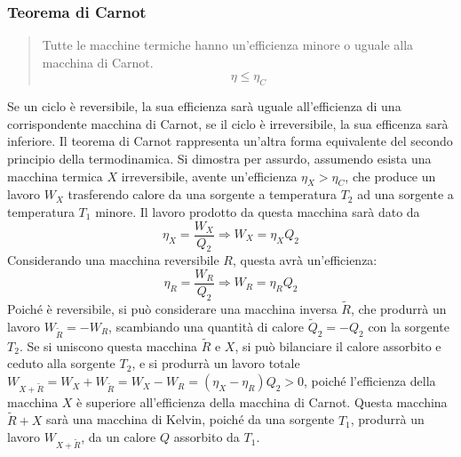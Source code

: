 \documentclass{article}
\numberwithin{equation}{subsection}
\begin{document}
\subsubsection{Teorema di Carnot}
\begin{quotation}
    Tutte le macchine termiche hanno un'efficienza minore o uguale alla macchina di Carnot. 
    \begin{equation}
        \eta\leq\eta_C
    \end{equation}
\end{quotation}
Se un ciclo è reversibile, la sua efficienza sarà uguale all'efficienza di una corrispondente macchina di Carnot, 
se il ciclo è irreversibile, la sua efficenza sarà inferiore. 
Il teorema di Carnot rappresenta un'altra forma equivalente del secondo principio della termodinamica. Si dimostra per assurdo, assumendo esista una macchina termica $X$ 
irreversibile, avente un'efficienza $\eta_X>\eta_C$, che produce 
un lavoro $W_X$ trasferendo calore da una sorgente a temperatura $T_2$ ad una sorgente a temperatura $T_1$ minore. Il lavoro prodotto da questa macchina sarà dato da
\begin{equation}
    \eta_X=\displaystyle\frac{W_X}{Q_2}\Rightarrow W_X=\eta_XQ_2
\end{equation}
Considerando una macchina reversibile $R$, questa avrà un'efficienza:
\begin{equation}
    \eta_R=\displaystyle\frac{W_R}{Q_2}\Rightarrow W_R=\eta_RQ_2
\end{equation}
Poiché è reversibile, si può considerare una macchina inversa $\tilde{R}$, che produrrà un lavoro $W_{\tilde{R}}=-W_R$, scambiando una quantità di calore 
$\tilde{Q}_2=-Q_2$ con la sorgente $T_2$. Se si uniscono questa macchina $\tilde R$ e $X$, si può bilanciare il calore assorbito e ceduto alla sorgente $T_2$, e 
si produrrà un lavoro totale $W_{X+\tilde{R}}=W_X+W_{\tilde{R}}=W_X-W_R=(\eta_X-\eta_R)Q_2>0$, poiché l'efficienza della macchina $X$ è superiore all'efficienza della macchina di Carnot. 
Questa macchina $\tilde{R}+X$ sarà una macchina di Kelvin, poiché da una sorgente $T_1$, produrrà un lavoro $W_{X+\tilde{R}}$, da un calore $Q$ assorbito da $T_1$. 
\end{document}
